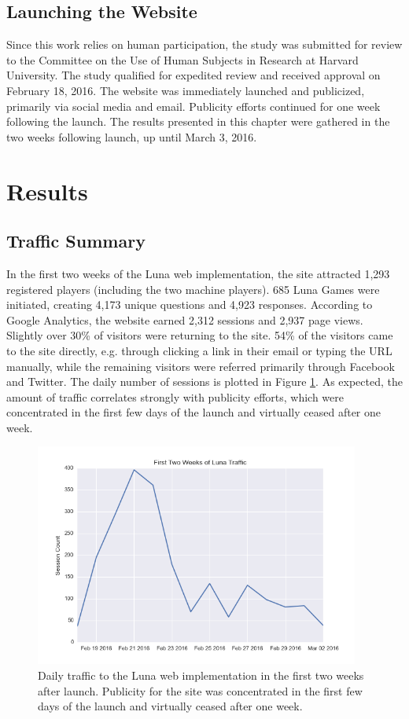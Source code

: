 \subsection{Launching the Website}

Since this work relies on human participation, the study was submitted for review to the Committee on the Use of Human Subjects in Research at Harvard University. The study qualified for expedited review and received approval on February 18, 2016. The website was immediately launched and publicized, primarily via social media and email. Publicity efforts continued for one week following the launch. The results presented in this chapter were gathered in the two weeks following launch, up until March 3, 2016. 

\section{Results}

\subsection{Traffic Summary}

In the first two weeks of the Luna web implementation, the site attracted 1,293 registered players (including the two machine players). 685 Luna Games were initiated, creating 4,173 unique questions and 4,923 responses. According to Google Analytics, the website earned 2,312 sessions and 2,937 page views. Slightly over 30\% of visitors were returning to the site. 54\% of the visitors came to the site directly, e.g. through clicking a link in their email or typing the URL manually, while the remaining visitors were referred primarily through Facebook and Twitter. The daily number of sessions is plotted in Figure \ref{trafficplot}. As expected, the amount of traffic correlates strongly with publicity efforts, which were concentrated in the first few days of the launch and virtually ceased after one week.

\begin{figure}
\includegraphics[width=0.95\textwidth]{figures/trafficPlot.png}
\caption{Daily traffic to the Luna web implementation in the first two weeks after launch. Publicity for the site was concentrated in the first few days of the launch and virtually ceased after one week.}
\label{trafficplot}
\end{figure}

